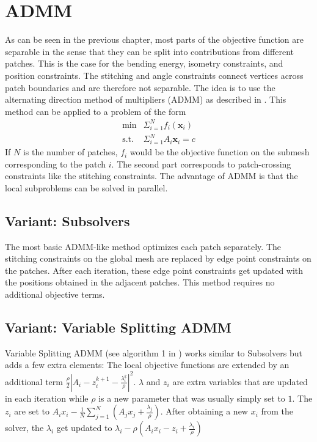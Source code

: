 \documentclass[a4paper,twoside,12pt,nochapterprefix]{scrbook}
\begin{document}
\chapter{ADMM}\label{sec:admm}
As can be seen in the previous chapter, most parts of the objective function are separable in the sense that they can be split into contributions from different patches. This is the case for the bending energy, isometry constraints, and position constraints. The stitching and angle constraints connect vertices across patch boundaries and are therefore not separable.\newline
The idea is to use the alternating direction method of multipliers (ADMM) as described in \cite{Deng2017ParallelMA}. This method can be applied to a problem of the form
\begin{equation}
\begin{array}{lr}
\mbox{min} & \Sigma_{i=1}^{N} f_i(\mathbf{x}_i) \\
\mbox{s.t.} & \Sigma_{i=1}^{N} A_i \mathbf{x}_i = c
\end{array}
\end{equation}
If $N$ is the number of patches, $f_i$ would be the objective function on the submesh corresponding to the patch $i$. The second part corresponds to patch-crossing constraints like the stitching constraints. The advantage of ADMM is that the local subproblems can be solved in parallel.\newline
\section{Variant: Subsolvers}
The most basic ADMM-like method optimizes each patch separately. The stitching constraints on the global mesh are replaced by edge point constraints on the patches. After each iteration, these edge point constraints get updated with the positions obtained in the adjacent patches. This method requires no additional objective terms.\newline
\section{Variant: Variable Splitting ADMM}
Variable Splitting ADMM (see algorithm 1 in \cite{Deng2017ParallelMA}) works similar to Subsolvers but adds a few extra elements: The local objective functions%
 are extended by an additional term $\frac{\rho}{2}|A_i - z^{k+1}_i -\frac{\lambda_i^k}{\rho} |^2$. $\lambda$ and $z_i$ are extra variables that are updated in each iteration while $\rho$ is a new parameter that was usually simply set to $1$. The $z_i$ are set to $A_i x_i - \frac{1}{N}\sum_{j=1}^N(A_j x_j + \frac{\lambda_j}{\rho})$. After obtaining a new $x_i$ from the solver, the $\lambda_i$ get updated to $\lambda_i - \rho(A_i x_i - z_i +\frac{\lambda_i}{\rho})$
\end{document}
